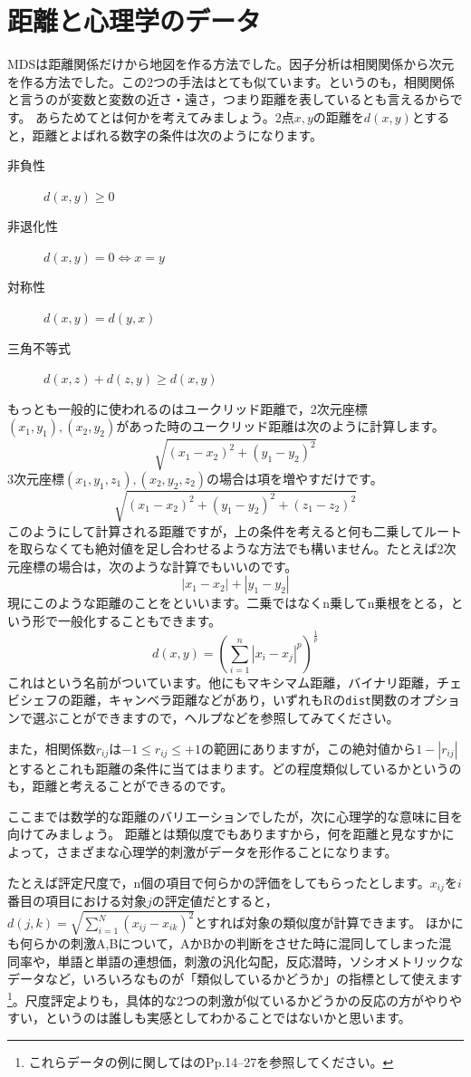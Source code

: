 \documentclass{ltjsbook}
\begin{document}
\section{距離と心理学のデータ}
\label{distance}
MDSは距離関係だけから地図を作る方法でした。因子分析は相関関係から次元を作る方法でした。この2つの手法はとても似ています。というのも，相関関係と言うのが変数と変数の近さ・遠さ，つまり距離を表しているとも言えるからです。
あらためてとは何かを考えてみましょう。2点$x,y$の距離を$d(x,y)$とすると，距離とよばれる数字の条件は次のようになります。
\begin{description}
	\item[非負性] $d(x,y)\ge 0$
	\item[非退化性] $d(x,y)=0 \Leftrightarrow x=y$
	\item[対称性] $d(x,y)=d(y,x)$
	\item[三角不等式] $d(x,z) + d(z,y) \ge d(x,y)$
\end{description}
もっとも一般的に使われるのはユークリッド距離で，2次元座標$(x_1,y_1),(x_2,y_2)$があった時のユークリッド距離は次のように計算します。
\[ \sqrt{(x_1-x_2)^2+(y_1-y_2)^2} \]
3次元座標$(x_1,y_1,z_1),(x_2,y_2,z_2)$の場合は項を増やすだけです。
\[ \sqrt{(x_1-x_2)^2+(y_1-y_2)^2+(z_1-z_2)^2} \]
このようにして計算される距離ですが，上の条件を考えると何も二乗してルートを取らなくても絶対値を足し合わせるような方法でも構いません。たとえば2次元座標の場合は，次のような計算でもいいのです。
\[ |x_1-x_2|+|y_1-y_2| \]
現にこのような距離のことをといいます。二乗ではなくn乗してn乗根をとる，という形で一般化することもできます。
\[ d(x,y) = \left( \sum_{i=1}^n |x_i - x_j|^p\right)^{\frac{1}{p}} \]
これはという名前がついています。他にもマキシマム距離，バイナリ距離，チェビシェフの距離，キャンベラ距離などがあり，いずれもRの\texttt{dist}関数のオプションで選ぶことができますので，ヘルプなどを参照してみてください。

また，相関係数$r_{ij}$は$-1 \le r_{ij} \le +1$の範囲にありますが，この絶対値から$1-|r_{ij}|$とするとこれも距離の条件に当てはまります。どの程度類似しているかというのも，距離と考えることができるのです。

ここまでは数学的な距離のバリエーションでしたが，次に心理学的な意味に目を向けてみましょう。
距離とは類似度でもありますから，何を距離と見なすかによって，さまざまな心理学的刺激がデータを形作ることになります。

たとえば評定尺度で，n個の項目で何らかの評価をしてもらったとします。$x_{ij}$を$i$番目の項目における対象$j$の評定値だとすると，
$d(j,k) = \sqrt{\sum_{i=1}^N (x_{ij}-x_{ik})^2 }$とすれば対象の類似度が計算できます。
ほかにも何らかの刺激A,Bについて，AかBかの判断をさせた時に混同してしまった混同率や，単語と単語の連想価，刺激の汎化勾配，反応潜時，ソシオメトリックなデータなど，いろいろなものが「類似しているかどうか」の指標として使えます\footnote{これらデータの例に関しては\citet{Takane198002}のPp.14--27を参照してください。}。尺度評定よりも，具体的な2つの刺激が似ているかどうかの反応の方がやりやすい，というのは誰しも実感としてわかることではないかと思います。
\end{document}
